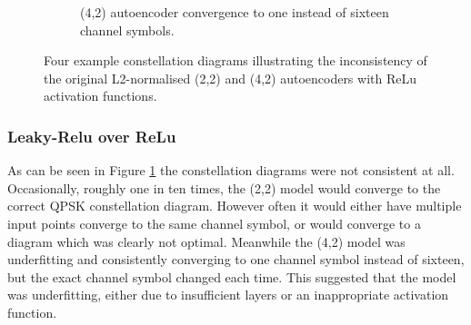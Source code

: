\documentclass[12pt,onecolumn,letterpaper]{article}
\begin{document}
\begin{figure}[t!]
\begin{subfigure}[t]{0.2\textwidth}
       \caption{(4,2) autoencoder convergence to one instead of sixteen channel symbols.}
   \end{subfigure}
   \caption{Four example constellation diagrams illustrating the inconsistency of the original L2-normalised (2,2) and (4,2) autoencoders with ReLu activation functions.}
   \label{fig:InconsistentReluConstDiags}
\end{figure}

\subsubsection{Leaky-Relu over ReLu}

As can be seen in Figure \ref{fig:InconsistentReluConstDiags} the constellation diagrams were not consistent at all. Occasionally, roughly one in ten times, the (2,2) model would converge to the correct QPSK constellation diagram. However often it would either have multiple input points converge to the same channel symbol, or would converge to a diagram which was clearly not optimal. Meanwhile the (4,2) model was underfitting and consistently converging to one channel symbol instead of sixteen, but the exact channel symbol changed each time. This suggested that the model was underfitting, either due to insufficient layers or an inappropriate activation function.
\end{document}
